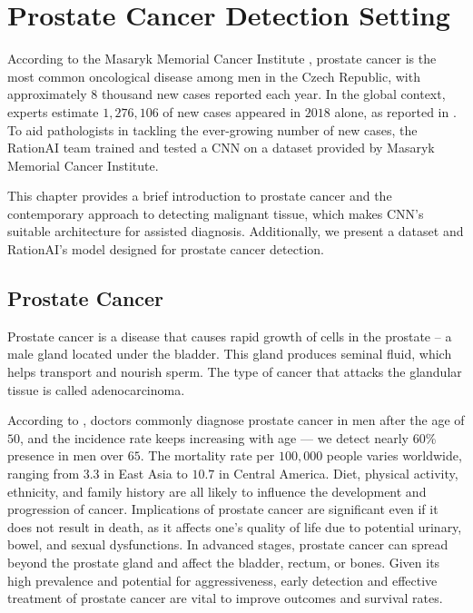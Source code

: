 \chapter{Prostate Cancer Detection Setting}

According to the Masaryk Memorial Cancer Institute \cite{mmci-prostate-cancer}, prostate cancer is the most common oncological disease among men in the Czech Republic, with approximately $8$ thousand new cases reported each year.
In the global context, experts estimate $1,276,106$ of new cases appeared in $2018$ alone, as reported in \cite{world-prostate-cancer}.
To aid pathologists in tackling the ever-growing number of new cases, the RationAI team trained and tested a CNN on a dataset provided by Masaryk Memorial Cancer Institute.

This chapter provides a brief introduction to prostate cancer and the contemporary approach to detecting malignant tissue, which makes CNN's suitable architecture for assisted diagnosis.
Additionally, we present a dataset and RationAI’s model designed for prostate cancer detection.

\section{Prostate Cancer}

Prostate cancer is a disease that causes rapid growth of cells in the prostate -- a male gland located under the bladder.
This gland produces seminal fluid, which helps transport and nourish sperm.
The type of cancer that attacks the glandular tissue is called adenocarcinoma.

According to \cite{world-prostate-cancer}, doctors commonly diagnose prostate cancer in men after the age of $50$, and the incidence rate keeps increasing with age --- we detect nearly $60$\% presence in men over $65$.
The mortality rate per $100,000$ people varies worldwide, ranging from $3.3$ in East Asia to $10.7$ in Central America. Diet, physical activity, ethnicity, and family history are all likely to influence the development and progression of cancer.
Implications of prostate cancer are significant even if it does not result in death, as it affects one's quality of life due to potential urinary, bowel, and sexual dysfunctions.
In advanced stages, prostate cancer can spread beyond the prostate gland and affect the bladder, rectum, or bones.
Given its high prevalence and potential for aggressiveness, early detection and effective treatment of prostate cancer are vital to improve outcomes and survival rates.

